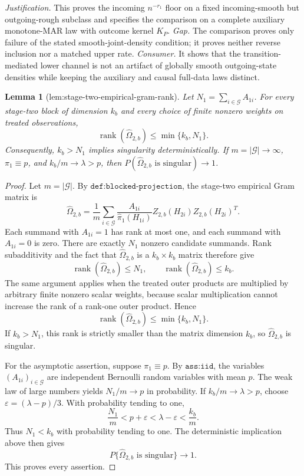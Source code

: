 \documentclass{article}
\newtheorem{lemma}{Lemma}
\begin{document}
\par\smallskip\noindent \textit{Justification.} This proves the incoming \(n^{-r_1}\) floor on a fixed incoming-smooth but outgoing-rough subclass and specifies the comparison on a complete auxiliary monotone-MAR law with outcome kernel \(K_P\). \textit{Gap.} The comparison proves only failure of the stated smooth-joint-density condition; it proves neither reverse inclusion nor a matched upper rate. \textit{Consumer.} It shows that the transition-mediated lower channel is not an artifact of globally smooth outgoing-state densities while keeping the auxiliary and causal full-data laws distinct.

\begin{lemma}[lem:stage-two-empirical-gram-rank]\label{lem:stage-two-empirical-gram-rank}
Let \(N_1=\sum_{i\in\mathcal G}A_{1i}\). For every stage-two block of dimension \(k_b\) and every choice of finite nonzero weights on treated observations,
\[
\operatorname{rank}(\widehat\Omega_{2,b})\le\min\{k_b,N_1\}.
\]
Consequently, \(k_b>N_1\) implies singularity deterministically. If \(m=|\mathcal G|\to\infty\), \(\pi_1\equiv p\), and \(k_b/m\to\lambda>p\), then \(P(\widehat\Omega_{2,b}\text{ is singular})\to1\).
\end{lemma}
\begin{proof}
Let \(m=|\mathcal G|\). By \(\texttt{def:blocked-projection}\), the stage-two empirical Gram matrix is
\[
\widehat\Omega_{2,b}=\frac{1}{m}\sum_{i\in\mathcal G}
\frac{A_{1i}}{\widehat\pi_1(H_{1i})}
Z_{2,b}(H_{2i})Z_{2,b}(H_{2i})^T.
\]
Each summand with \(A_{1i}=1\) has rank at most one, and each summand with \(A_{1i}=0\) is zero. There are exactly \(N_1\) nonzero candidate summands. Rank subadditivity and the fact that \(\widehat\Omega_{2,b}\) is a \(k_b\times k_b\) matrix therefore give
\[
\operatorname{rank}(\widehat\Omega_{2,b})\le N_1,
\qquad
\operatorname{rank}(\widehat\Omega_{2,b})\le k_b.
\]
The same argument applies when the treated outer products are multiplied by arbitrary finite nonzero scalar weights, because scalar multiplication cannot increase the rank of a rank-one outer product. Hence
\[
\operatorname{rank}(\widehat\Omega_{2,b})
\le\min\{k_b,N_1\}.
\]
If \(k_b>N_1\), this rank is strictly smaller than the matrix dimension \(k_b\), so \(\widehat\Omega_{2,b}\) is singular.

For the asymptotic assertion, suppose \(\pi_1\equiv p\). By \(\texttt{ass:iid}\), the variables \((A_{1i})_{i\in\mathcal G}\) are independent Bernoulli random variables with mean \(p\). The weak law of large numbers yields \(N_1/m\to p\) in probability. If \(k_b/m\to\lambda>p\), choose \(\varepsilon=(\lambda-p)/3\). With probability tending to one,
\[
\frac{N_1}{m}<p+\varepsilon<\lambda-\varepsilon<\frac{k_b}{m}.
\]
Thus \(N_1<k_b\) with probability tending to one. The deterministic implication above then gives
\[
P\{\widehat\Omega_{2,b}\text{ is singular}\}\longrightarrow1.
\]
This proves every assertion.
\end{proof}
\end{document}
